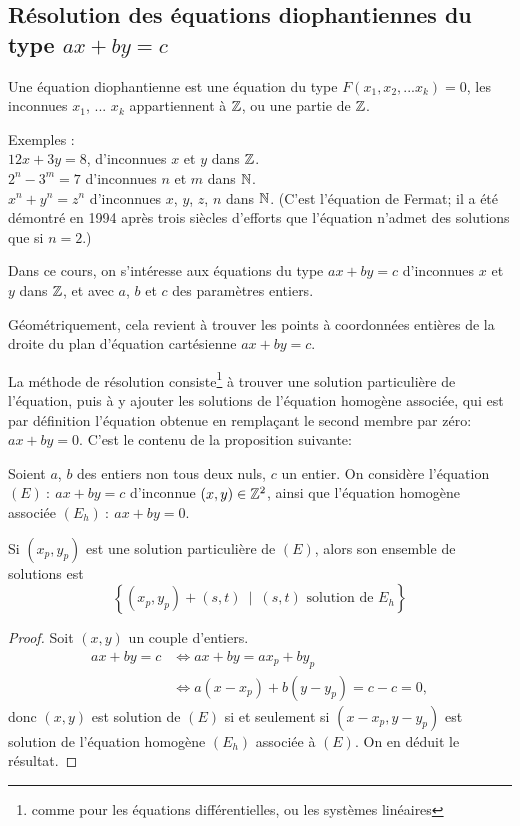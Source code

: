 \subsection{Résolution des équations diophantiennes du type $ax+by=c$}


\begin{definition}
Une équation diophantienne est une équation du type $F(x_1, x_2, ...x_k)=0$, les inconnues $x_1$, ... $x_k$ appartiennent à $\mathbb{Z}$, ou une partie de $\mathbb{Z}$.
\end{definition}

Exemples :\\
$12x+3y=8$, d'inconnues $x$ et $y$ dans $\mathbb{Z}$.\\
$2^n-3^m=7$ d'inconnues $n$ et $m$ dans $\mathbb{N}$.\\
$x^n+y^n=z^n$ d'inconnues $x$, $y$, $z$, $n$ dans $\mathbb{N}$. (C'est l'équation de Fermat; il a été démontré en 1994 après trois siècles d'efforts que l'équation n'admet des solutions que si $n=2$.)

Dans ce cours, on s'intéresse aux équations du type $ax+by=c$ d'inconnues $x$ et $y$ dans $\mathbb{Z}$, et avec $a$, $b$ et $c$ des paramètres entiers. 

Géométriquement, cela revient à trouver les points à coordonnées entières de la droite du plan d'équation cartésienne $ax+by=c$.

La méthode de résolution consiste\footnote{comme pour les équations différentielles, ou les systèmes linéaires} à trouver une solution particulière de l'équation, puis à y ajouter les solutions de l'équation homogène associée, qui est par définition l'équation obtenue en remplaçant le second membre par zéro: $ax+by=0$. C'est le contenu de la proposition suivante:

\begin{proposition}
Soient $a$, $b$ des entiers non tous deux  nuls, $c$ un entier. On considère l'équation $(E) \: : \: ax+by=c$ d'inconnue $(x,y)\in \mathbb{Z}^2$, ainsi que l'équation homogène associée $(E_h) \: : \: ax+by=0$. 

Si $(x_p,y_p)$ est une solution particulière de $(E)$, alors son ensemble de solutions est 
\[
\left\{(x_p,y_p) + (s,t)\:\mid\: (s,t) \text{ solution de } E_h\right\}
\]
\end{proposition}

\begin{proof}
Soit $(x,y)$ un couple d'entiers. 
\begin{align*}
ax+by=c 
&\iff ax+by = ax_p+by_p\\
&\iff a(x-x_p) + b(y-y_p) = c-c=0,
\end{align*}
donc $(x,y)$ est solution de $(E)$ si et seulement si $(x-x_p,y-y_p)$ est solution de l'équation homogène $(E_h)$ associée à $(E)$. On en déduit le résultat.
\end{proof}

